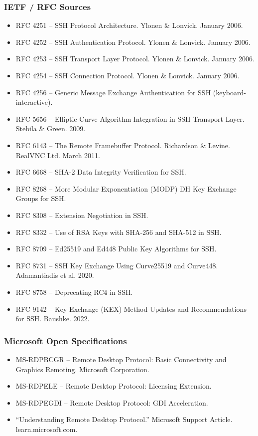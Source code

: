 \documentclass[11pt,letterpaper]{article}
\begin{document}
\subsubsection{IETF / RFC Sources}
\begin{itemize}
\item RFC 4251 -- SSH Protocol Architecture. Ylonen \& Lonvick. January 2006.
\item RFC 4252 -- SSH Authentication Protocol. Ylonen \& Lonvick. January 2006.
\item RFC 4253 -- SSH Transport Layer Protocol. Ylonen \& Lonvick. January 2006.
\item RFC 4254 -- SSH Connection Protocol. Ylonen \& Lonvick. January 2006.
\item RFC 4256 -- Generic Message Exchange Authentication for SSH (keyboard-interactive).
\item RFC 5656 -- Elliptic Curve Algorithm Integration in SSH Transport Layer. Stebila \& Green. 2009.
\item RFC 6143 -- The Remote Framebuffer Protocol. Richardson \& Levine. RealVNC Ltd. March 2011.
\item RFC 6668 -- SHA-2 Data Integrity Verification for SSH.
\item RFC 8268 -- More Modular Exponentiation (MODP) DH Key Exchange Groups for SSH.
\item RFC 8308 -- Extension Negotiation in SSH.
\item RFC 8332 -- Use of RSA Keys with SHA-256 and SHA-512 in SSH.
\item RFC 8709 -- Ed25519 and Ed448 Public Key Algorithms for SSH.
\item RFC 8731 -- SSH Key Exchange Using Curve25519 and Curve448. Adamantiadis et al. 2020.
\item RFC 8758 -- Deprecating RC4 in SSH.
\item RFC 9142 -- Key Exchange (KEX) Method Updates and Recommendations for SSH. Baushke. 2022.
\end{itemize}

\subsubsection{Microsoft Open Specifications}
\begin{itemize}
\item MS-RDPBCGR -- Remote Desktop Protocol: Basic Connectivity and Graphics Remoting. Microsoft Corporation.
\item MS-RDPELE -- Remote Desktop Protocol: Licensing Extension.
\item MS-RDPEGDI -- Remote Desktop Protocol: GDI Acceleration.
\item ``Understanding Remote Desktop Protocol.'' Microsoft Support Article. learn.microsoft.com.
\end{itemize}
\end{document}
